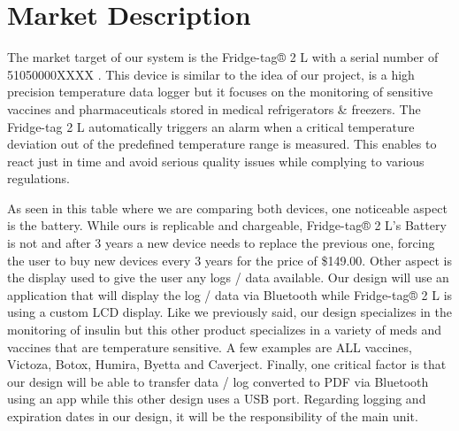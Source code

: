 \section{Market Description}
The market target of our system is the Fridge-tag® 2 L with a serial number of 51050000XXXX \cite{RefrigeratorTemperatureMonitoring}. This device is similar to the idea of our project, is a high precision temperature data logger but it focuses on the monitoring of sensitive vaccines and pharmaceuticals stored in medical refrigerators \& freezers. The Fridge-tag 2 L automatically triggers an alarm when a critical temperature deviation out of the predefined temperature range is measured. This enables to react just in time and avoid serious quality issues while complying to various regulations.

As seen in this table where we are comparing both devices, one noticeable aspect is the battery. While ours is replicable and chargeable, Fridge-tag® 2 L's Battery is not and after 3 years a new device needs to replace the previous one, forcing the user to buy new devices every 3 years for the price of \$149.00. Other aspect is the display used to give the user any logs / data available. Our design will use an application that will display the log / data via Bluetooth while Fridge-tag® 2 L is using a custom LCD display. Like we previously said, our design specializes in the monitoring of insulin but this other product specializes in a variety of meds and vaccines that are temperature sensitive. A few examples are ALL vaccines, Victoza, Botox, Humira, Byetta and Caverject. Finally, one critical factor is that our design will be able to transfer data / log converted to PDF via Bluetooth using an app while this other design uses a USB port. Regarding logging and expiration dates in our design, it will be the responsibility of the main unit. 

